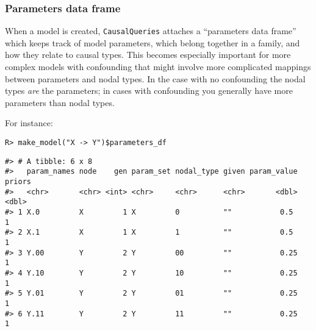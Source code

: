 \documentclass[
  11pt,
  article]{jss}
\begin{document}
\hypertarget{sec-param-df}{%
\subsubsection{Parameters data frame}\label{sec-param-df}}

When a model is created, \texttt{CausalQueries} attaches a ``parameters
data frame'' which keeps track of model parameters, which belong
together in a family, and how they relate to causal types. This becomes
especially important for more complex models with confounding that might
involve more complicated mappings between parameters and nodal types. In
the case with no confounding the nodal types \emph{are} the parameters;
in cases with confounding you generally have more parameters than nodal
types.

For instance:

\begin{verbatim}
R> make_model("X -> Y")$parameters_df
\end{verbatim}

\begin{verbatim}
#> # A tibble: 6 x 8
#>   param_names node    gen param_set nodal_type given param_value priors
#>   <chr>       <chr> <int> <chr>     <chr>      <chr>       <dbl>  <dbl>
#> 1 X.0         X         1 X         0          ""           0.5       1
#> 2 X.1         X         1 X         1          ""           0.5       1
#> 3 Y.00        Y         2 Y         00         ""           0.25      1
#> 4 Y.10        Y         2 Y         10         ""           0.25      1
#> 5 Y.01        Y         2 Y         01         ""           0.25      1
#> 6 Y.11        Y         2 Y         11         ""           0.25      1
\end{verbatim}

\hypertarget{tbl-params-df}{}
\begin{table}
\caption{\label{tbl-params-df}Example of Parameters Data Frame }\tabularnewline

\centering
{}
\end{table}
\end{document}
